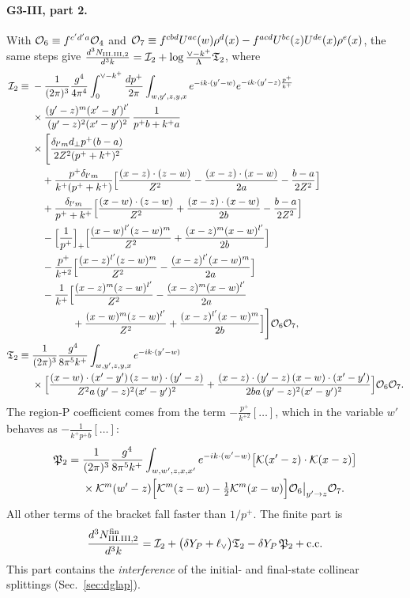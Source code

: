 \paragraph*{G3-III, part 2.} With $\mathcal{O}_6\equiv f^{c'd'a}\mathcal{O}_4$ and $\mathcal{O}_7\equiv f^{cbd}U^{ac}(w)\rho^d(x)-f^{acd}U^{bc}(z)U^{de}(x)\rho^e(x)$, the same steps give $\frac{d^3N_{\rm III.III,2}}{d^3k}=\mathcal I_2+\log\frac{\vee-k^+}{\Lambda}\mathfrak T_2$, where
\begin{align}
\mathcal I_2\equiv{}&-\frac{1}{(2\pi)^3}\frac{g^4}{4\pi^4}\int_0^{\vee-k^+}\frac{dp^+}{2\pi}\int_{w,y',z,y,x}e^{-ik\cdot(y'-w)}e^{-ik\cdot(y'-z)\frac{p^+}{k^+}}\notag\\
&\times\frac{(y'-z)^m(x'-y')^{l'}}{(y'-z)^2(x'-y')^2}\,\frac{1}{p^+b+k^+a}\notag\\
&\times\Bigg[\frac{\delta_{l'm}d_\perp p^+(b-a)}{2Z^2(p^++k^+)^2}\notag\\
&\quad+\frac{p^+\delta_{l'm}}{k^+(p^++k^+)}\Big[\frac{(x-z)\cdot(z-w)}{Z^2}-\frac{(x-z)\cdot(x-w)}{2a}-\frac{b-a}{2Z^2}\Big]\notag\\
&\quad+\frac{\delta_{l'm}}{p^++k^+}\Big[\frac{(x-w)\cdot(z-w)}{Z^2}+\frac{(x-z)\cdot(x-w)}{2b}-\frac{b-a}{2Z^2}\Big]\notag\\
&\quad-\Big[\frac{1}{p^+}\Big]_+\Big[\frac{(x-w)^{l'}(z-w)^m}{Z^2}+\frac{(x-z)^m(x-w)^{l'}}{2b}\Big]\notag\\
&\quad-\frac{p^+}{k^{+2}}\Big[\frac{(x-z)^{l'}(z-w)^m}{Z^2}-\frac{(x-z)^{l'}(x-w)^m}{2a}\Big]\notag\\
&\quad-\frac{1}{k^+}\Big[\frac{(x-z)^m(z-w)^{l'}}{Z^2}-\frac{(x-z)^m(x-w)^{l'}}{2a}\notag\\
&\hspace{4em}+\frac{(x-w)^m(z-w)^{l'}}{Z^2}+\frac{(x-z)^{l'}(x-w)^m}{2b}\Big]\Bigg]\mathcal{O}_6\mathcal{O}_7,\notag\\
\mathfrak T_2\equiv{}&\frac{1}{(2\pi)^3}\frac{g^4}{8\pi^5k^+}\int_{w,y',z,y,x}e^{-ik\cdot(y'-w)}\notag\\
&\times\Big[\frac{(x-w)\cdot(x'-y')\,(z-w)\cdot(y'-z)}{Z^2a\,(y'-z)^2(x'-y')^2}+\frac{(x-z)\cdot(y'-z)\,(x-w)\cdot(x'-y')}{2ba\,(y'-z)^2(x'-y')^2}\Big]\mathcal{O}_6\mathcal{O}_7.
\label{eq:GIIIIII2}
\end{align}
The region-P coefficient comes from the term $-\frac{p^+}{k^{+2}}[\dots]$, which in the variable $w'$ behaves as $-\frac{1}{k^+p^+b}[\dots]$:
\begin{align}
\mathfrak P_2={}&\frac{1}{(2\pi)^3}\frac{g^4}{8\pi^5k^+}\int_{w,w',z,x,x'}e^{-ik\cdot(w'-w)}\big[\mathcal{K}(x'-z)\cdot\mathcal{K}(x-z)\big]\notag\\
&\times\mathcal{K}^m(w'-z)\Big[\mathcal{K}^m(z-w)-\tfrac12\mathcal{K}^m(x-w)\Big]\mathcal{O}_6\big|_{y'\to z}\mathcal{O}_7 .
\end{align}
All other terms of the bracket fall faster than $1/p^+$. The finite part is
\begin{equation}
\frac{d^3N^{\rm fin}_{\rm III.III,2}}{d^3k}=\mathcal I_2+\big(\delta Y_P+\ell_{\vee}\big)\mathfrak T_2-\delta Y_P\,\mathfrak P_2+{\rm c.c.}
\end{equation}
This part contains the \emph{interference} of the initial- and final-state collinear splittings (Sec.~\ref{sec:dglap}).


